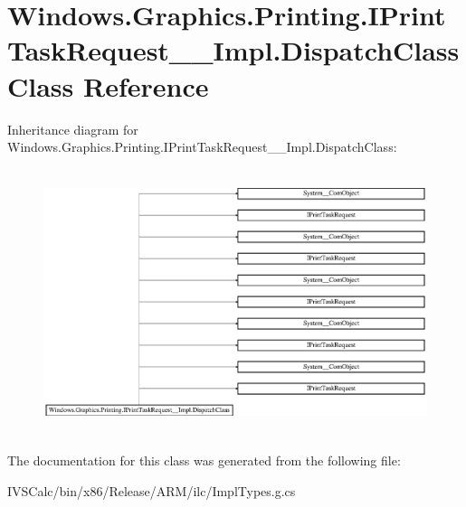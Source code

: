 \hypertarget{class_windows_1_1_graphics_1_1_printing_1_1_i_print_task_request_____impl_1_1_dispatch_class}{}\section{Windows.\+Graphics.\+Printing.\+I\+Print\+Task\+Request\+\_\+\+\_\+\+Impl.\+Dispatch\+Class Class Reference}
\label{class_windows_1_1_graphics_1_1_printing_1_1_i_print_task_request_____impl_1_1_dispatch_class}
Inheritance diagram for Windows.\+Graphics.\+Printing.\+I\+Print\+Task\+Request\+\_\+\+\_\+\+Impl.\+Dispatch\+Class\+:\begin{figure}[H]
\begin{center}
\leavevmode
\includegraphics[height=7.797468cm]{class_windows_1_1_graphics_1_1_printing_1_1_i_print_task_request_____impl_1_1_dispatch_class}
\end{center}
\end{figure}


The documentation for this class was generated from the following file\+:\begin{DoxyCompactItemize}
\item 
I\+V\+S\+Calc/bin/x86/\+Release/\+A\+R\+M/ilc/Impl\+Types.\+g.\+cs\end{DoxyCompactItemize}
